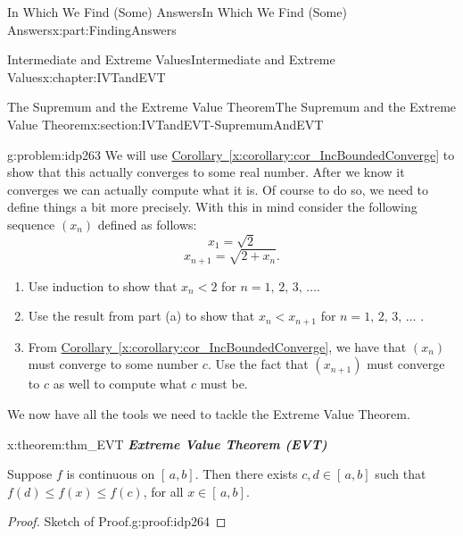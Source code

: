 \documentclass[oneside,10pt,]{book}
\newcommand{\xreffont}{\relax}
\newcommand{\alert}[1]{\textbf{\textit{#1}}}
\newcommand{\terminology}[1]{\textbf{#1}}
\numberwithin{equation}{section}
\newcommand{\lt}{<}
\begin{document}
\begin{partptx}{In Which We Find (Some) Answers}{}{In Which We Find (Some) Answers}{}{}{x:part:FindingAnswers}
\begin{chapterptx}{Intermediate and Extreme Values}{}{Intermediate and Extreme Values}{}{}{x:chapter:IVTandEVT}
\begin{sectionptx}{The Supremum and the Extreme Value Theorem}{}{The Supremum and the Extreme Value Theorem}{}{}{x:section:IVTandEVT-SupremumAndEVT}
\begin{problem}{}{g:problem:idp263}
We will use \hyperref[x:corollary:cor_IncBoundedConverge]{Corollary~{\xreffont\ref{x:corollary:cor_IncBoundedConverge}}} to show that this actually converges to some real number. After we know it converges we can actually compute what it is. Of course to do so, we need to define things a bit more precisely. With this in mind consider the following sequence \(\left(x_n\right)\) defined as follows:%
\begin{equation*}
x_1=\sqrt{2}
\end{equation*}
%
\begin{equation*}
x_{n+1}=\sqrt{2+x_n}\text{.}
\end{equation*}
%
\begin{enumerate}[label=(\alph*)]
\item{}Use induction to show that \(x_n\lt 2\) for \(n=1,\,2,\,3,\,\ldots\).%
\item{}Use the result from part (a) to show that \(x_n\lt x_{n+1}\) for \(n=1,\,2,\,3,\,\ldots\) .%
\item{}From \hyperref[x:corollary:cor_IncBoundedConverge]{Corollary~{\xreffont\ref{x:corollary:cor_IncBoundedConverge}}}, we have that \(\left(x_n\right)\) must converge to some number \(c\). Use the fact that \(\left(x_{n+1}\right)\) must converge to \(c\) as well to compute what \(c\) must be.%
\end{enumerate}
%
\end{problem}
We now have all the tools we need to tackle the Extreme Value Theorem.%
\begin{theorem}{}{}{x:theorem:thm_EVT}%
\alert{Extreme Value Theorem (\terminology{EVT})}%
\par
{} Suppose \(f\) is continuous on \([\,a,b]\). Then there exists \(c,d\in[\,a,b]\) such that \(f(d)\leq f(x)\leq f(c)\), for all \(x\in[\,a,b]\).%
\end{theorem}
\begin{proof}{Sketch of Proof.}{g:proof:idp264}

\end{proof}
\end{sectionptx}
\end{chapterptx}
\end{partptx}
\end{document}
